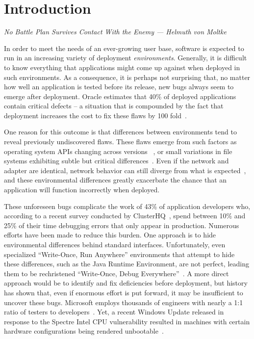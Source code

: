 \chapter{Introduction}
\label{chap:intro}
\textit{No Battle Plan Survives Contact With the Enemy --- Helmuth von Moltke}

In order to meet the needs of an ever-growing user base,
software is expected to run in an increasing variety of deployment \emph{environments}. Generally, it is difficult to know everything that applications might come up against when deployed in such environments. As a consequence, it is perhaps not surprising that, no matter how well an application is tested before its release,
new bugs always seem to emerge after deployment.
Oracle estimates that 40\% of deployed applications
contain critical defects -- a situation that is compounded
by the fact that deployment
increases the cost to fix these flaws by 100 fold~\cite{OracleAppQuality}.

One reason for this outcome
is that differences between environments tend to
reveal previously undiscovered flaws.
These flaws emerge from
such factors as
operating system APIs changing across versions
~\cite{LinuxGlibcChanges, WinAPICompat, MuslDifferences},
or small variations in file systems exhibiting subtle but critical
differences~\cite{EXT4Layout, AppleHFS, WindowsNTFS}.
Even if the network and adapter are identical,
network behavior can still diverge from what is expected~\cite{vbox,
NMAPOSDifferences, VMWareNATFailure},
and these environmental differences greatly exacerbate
the chance that an application will function incorrectly when deployed.

These unforeseen bugs
complicate the work of 43\% of application developers who, according to a
recent survey conducted by ClusterHQ~\cite{ClusterHQSurvey},
spend between 10\% and 25\% of their time
debugging errors that only appear in production.
Numerous efforts have been made to reduce this burden.
One approach
is to hide environmental differences behind standard interfaces.
Unfortunately,
even specialized ``Write-Once, Run Anywhere'' environments
that attempt to hide these differences,
such as the Java Runtime Environment,
are not perfect,
leading them to be rechristened ``Write-Once, Debug Everywhere''~\cite{WODE}.
A more direct approach would be
to identify and fix deficiencies before deployment,
but history has shown that,
even if enormous effort is put forward,
it may be insufficient to uncover these bugs.
Microsoft employs thousands of engineers with nearly a
1:1 ratio of testers to developers~\cite{Page2009}.
Yet, a recent Windows Update released
in response to the Spectre Intel CPU vulnerability
resulted in machines with certain hardware configurations
being rendered unbootable~\cite{kb4056892}.

